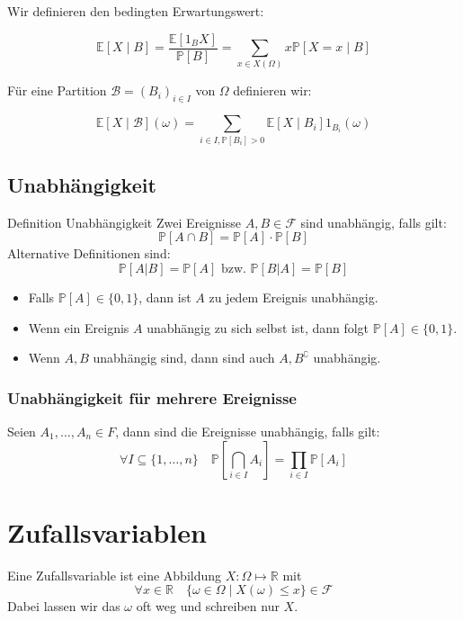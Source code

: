 \documentclass[a4paper,10pt]{article}
\def\R{\mathbb{R}}
\def\P{\mathbb{P}}
\def\F{\mathcal{F}}
\def\E{\mathbb{E}}
\begin{document}
Wir definieren den bedingten Erwartungswert:

$$
	\E[X \mid B] = \frac{\E[1_B X]}{\P[B]} = \sum_{x \in X(\Omega)} x \P[X = x \mid B]
$$

Für eine Partition $\mathcal{B} = (B_i)_{i \in I}$ von $\Omega$ definieren wir:

$$
	\E[X \mid \mathcal{B}](\omega) = \sum_{i \in I, \P[B_i] > 0} \E[X \mid B_i] 1_{B_i}(\omega)
$$

\subsection{Unabhängigkeit}
\begin{mainbox}{Definition Unabhängigkeit}
	Zwei Ereignisse \(A, B\in \F\) sind unabhängig, falls gilt:
	\[\P[A\cap B] = \P[A] \cdot \P[B]\]
	Alternative Definitionen sind:
	\[\P[A|B] = \P[A] \text{ bzw. } \P[B|A] = \P[B]\]
\end{mainbox}
\begin{itemize}
	\item Falls \(\P[A] \in \{0,1\}\), dann ist \(A\) zu jedem Ereignis unabhängig.
	\item Wenn ein Ereignis \(A\) unabhängig zu sich selbst ist, dann folgt \(\P[A] \in \{0,1\}\).
	\item Wenn \(A, B\) unabhängig sind, dann sind auch \(A, B^\complement\) unabhängig.
\end{itemize}
\subsubsection*{Unabhängigkeit für mehrere Ereignisse}
Seien \(A_1, \ldots, A_n \in F\), dann sind die Ereignisse unabhängig, falls gilt:
\[\forall I \subseteq \{1, \ldots, n\} \quad \P \left[ \bigcap_{i\in I}A_i \right] = \prod_{i\in I} \P[A_i]\]

\section{Zufallsvariablen}
Eine Zufallsvariable ist eine Abbildung \(X: \Omega \mapsto \R\) mit
\[\forall x \in \R \quad \{\omega \in \Omega \mid X(\omega) \leq x\} \in \F\]
Dabei lassen wir das \(\omega\) oft weg und schreiben nur \(X\).
\end{document}
